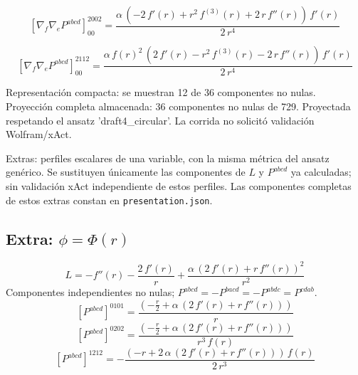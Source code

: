 \documentclass[11pt]{article}
\begin{document}
\par\smallskip
\begin{dmath*}[breakdepth={5}]
\left[\nabla_f\nabla_e P^{abcd}\right]_{00}^{2002} = \frac{\alpha\,\left(-2\,f'\!\left(r\right) + {r}^{2}\,f^{(3)}\!\left(r\right) + 2\,r\,f''\!\left(r\right)\right)\,f'\!\left(r\right)}{2\,{r}^{4}}
\end{dmath*}
\par\smallskip
\begin{dmath*}[breakdepth={5}]
\left[\nabla_f\nabla_e P^{abcd}\right]_{00}^{2112} = \frac{\alpha\,{f\!\left(r\right)}^{2}\,\left(2\,f'\!\left(r\right) - {r}^{2}\,f^{(3)}\!\left(r\right) - 2\,r\,f''\!\left(r\right)\right)\,f'\!\left(r\right)}{2\,{r}^{4}}
\end{dmath*}
\par\smallskip
Representación compacta: se muestran 12 de 36 componentes no nulas.
Proyección completa almacenada: 36 componentes no nulas de 729. Proyectada respetando el ansatz 'draft4\_circular'. La corrida no solicitó validación Wolfram/xAct.\par\medskip
\par\medskip Extras: perfiles escalares de una variable, con la misma métrica del ansatz genérico. Se sustituyen únicamente las componentes de $L$ y $P^{abcd}$ ya calculadas; sin validación xAct independiente de estos perfiles. Las componentes completas de estos extras constan en \texttt{presentation.json}.
\subsection*{Extra: $\phi=\Phi\!\left(r\right)$}
\begin{dmath*}[breakdepth={5}]
L=-f''\!\left(r\right) - \frac{2\,f'\!\left(r\right)}{r} + \frac{\alpha\,{\left(2\,f'\!\left(r\right) + r\,f''\!\left(r\right)\right)}^{2}}{{r}^{2}}
\end{dmath*}
Componentes independientes no nulas; $P^{abcd}=-P^{bacd}=-P^{abdc}=P^{cdab}$.
\begin{dmath*}[breakdepth={5}]
\left[P^{abcd}\right]^{0101}=\frac{\left(-\frac{r}{2} + \alpha\,\left(2\,f'\!\left(r\right) + r\,f''\!\left(r\right)\right)\right)}{r}
\end{dmath*}
\begin{dmath*}[breakdepth={5}]
\left[P^{abcd}\right]^{0202}=\frac{\left(-\frac{r}{2} + \alpha\,\left(2\,f'\!\left(r\right) + r\,f''\!\left(r\right)\right)\right)}{{r}^{3}\,f\!\left(r\right)}
\end{dmath*}
\begin{dmath*}[breakdepth={5}]
\left[P^{abcd}\right]^{1212}=-\frac{\left(-r + 2\,\alpha\,\left(2\,f'\!\left(r\right) + r\,f''\!\left(r\right)\right)\right)\,f\!\left(r\right)}{2\,{r}^{3}}
\end{dmath*}
\end{document}
